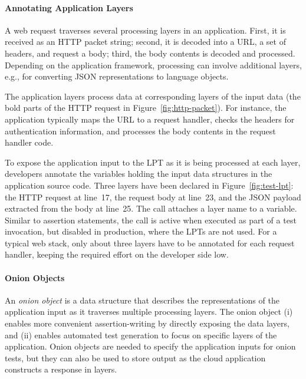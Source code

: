\paragraph{Annotating Application Layers}

A web request traverses several processing layers in an application.  First, it is received as an HTTP packet string; second, it is decoded into a URL, a set of headers, and request a body; third, the body contents is decoded and processed. Depending on the application framework, processing can involve additional layers, e.g., for converting JSON representations to language objects.

The application layers process data at corresponding layers of the input data (the bold parts of the HTTP request in Figure~\ref{fig:http-packet}). For instance, the application typically maps the URL to a request handler, checks the headers for authentication information, and processes the body contents in the request handler code.

To expose the application input to the LPT as it is being processed at each layer, developers annotate the variables holding the input data structures in the application source code.  Three layers have been declared in Figure~\ref{fig:test-lpt}: the HTTP request at line~17, the request body at line~23, and the JSON payload extracted from the body at line~25.  The  call attaches a layer name to a variable. Similar to assertion statements, the call is active when executed as part of a test invocation, but disabled in production, where the LPTs are not used.  For a typical web stack, only about three layers have to be annotated for each request handler, keeping the required effort on the developer side low.


\paragraph{Onion Objects}

An \emph{onion object} is a data structure that describes the representations of the application input as it traverses multiple processing layers.  The onion object (i) enables more convenient assertion-writing by directly exposing the data layers, and (ii) enables automated test generation to focus on specific layers of the application. Onion objects are needed to specify the application inputs for onion tests, but they can also be used to store output as the cloud application constructs a response in layers.

